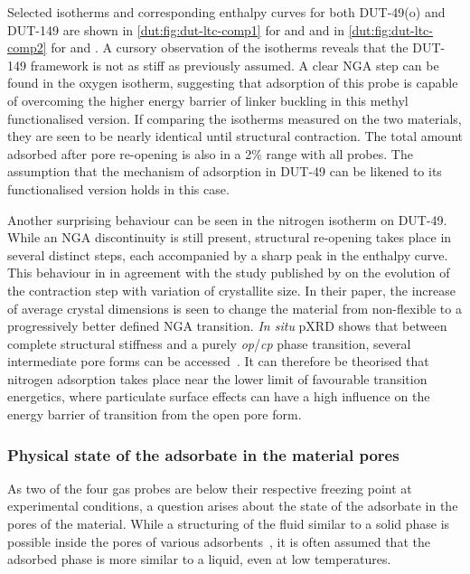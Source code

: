 Selected isotherms and corresponding enthalpy curves for both 
DUT-49(o) and DUT-149 are shown in \autoref{dut:fig:dut-ltc-comp1}
for  and  and in \autoref{dut:fig:dut-ltc-comp2}
for  and . A cursory observation of the isotherms
reveals that the DUT-149 framework is not as stiff as 
previously assumed. A clear \gls{NGA} step can be found in the 
oxygen isotherm, suggesting that adsorption of this probe is capable 
of overcoming the higher energy barrier of linker buckling in 
this methyl functionalised version.
If comparing the isotherms measured on the two materials, they
are seen to be nearly identical until structural contraction.
The total amount adsorbed after pore re-opening is also in a 
2\% range with all probes. The assumption that the mechanism 
of adsorption in DUT-49 can be likened to its functionalised
version holds in this case.

Another surprising behaviour
can be seen in the nitrogen isotherm on DUT-49. While an \gls{NGA}
discontinuity is still present, structural re-opening takes
place in several distinct steps, each accompanied by a sharp 
peak in the enthalpy curve. This behaviour in in
agreement with the study published by 
 \citet{krauseEffectCrystalliteSize2018}
on the evolution of the contraction step with variation of 
crystallite size. In their paper, the increase of average 
crystal dimensions is seen to change the material from non-flexible 
to a progressively better defined \gls{NGA} transition. \textit{In situ} 
\gls{pXRD} shows that between complete structural stiffness and a 
purely \textit{op}/\textit{cp} phase transition, several intermediate 
pore forms can be accessed~\cite{krauseEffectCrystalliteSize2018}. 
It can therefore be theorised that 
nitrogen adsorption takes place near the lower limit of 
favourable transition energetics, where particulate surface 
effects can have a high influence on the energy barrier of transition 
from the open pore form.

\subsubsection{Physical state of the adsorbate in the material pores}

As two of the four gas probes are below their respective freezing point
at experimental conditions, a question arises about the state of
the adsorbate in the pores of the material. While a structuring of
the fluid similar to a solid phase is possible inside the 
pores of various adsorbents~\cite{llewellynAdsorptionMFItypeZeolites1993a},
it is often assumed that the adsorbed phase is more similar to a liquid,
even at low temperatures.

